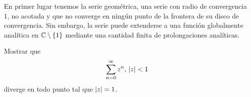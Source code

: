 
En primer lugar tenemos la serie geométrica, una serie con radio de convergencia $1$, no acotada y que no converge en ningún punto de la frontera de su disco de convergencia. Sin embargo, la serie puede extenderse a una función globalmente analítica en $\mathbb{C} \setminus \{1\}$ mediante una cantidad finita de prolongaciones analíticas. \\


\begin{example}
    Mostrar que
    \begin{equation*}
        \sum_{n=0}^{\infty} z^n, \, \left\lvert z\right\rvert < 1
    \end{equation*}
    diverge en todo punto tal que $\left\lvert z\right\rvert = 1$.
\end{example}


